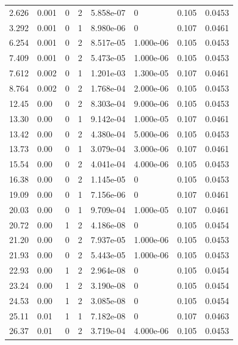 \documentclass[preview]{standalone}
\begin{document}
{{\begin{tabular}{L{1.2cm}C{1.2cm} C{0.3cm}C{0.5cm} C{1.4cm}C{1.4cm} C{1.4cm}C{1.4cm}}
  2.626  &  0.001  & 0     &  2 &  5.858e-07  & 0  & 0.105 &  0.0453   \\ 
  3.292  &  0.001  & 0     &  1 &  8.980e-06  & 0  & 0.107 &  0.0461   \\ 
  6.254  &  0.001  & 0     &  2 &  8.517e-05  & 1.000e-06  & 0.105 &  0.0453   \\ 
  7.409  &  0.001  & 0     &  2 &  5.473e-05  & 1.000e-06  & 0.105 &  0.0453   \\ 
  7.612  &  0.002  & 0     &  1 &  1.201e-03  & 1.300e-05  & 0.107 &  0.0461   \\ 
  8.764  &  0.002  & 0     &  2 &  1.768e-04  & 2.000e-06  & 0.105 &  0.0453   \\ 
  12.45  &  0.00  & 0     &  2 &  8.303e-04  & 9.000e-06  & 0.105 &  0.0453   \\ 
  13.30  &  0.00  & 0     &  1 &  9.142e-04  & 1.000e-05  & 0.107 &  0.0461   \\ 
  13.42  &  0.00  & 0     &  2 &  4.380e-04  & 5.000e-06  & 0.105 &  0.0453   \\ 
  13.73  &  0.00  & 0     &  1 &  3.079e-04  & 3.000e-06  & 0.107 &  0.0461   \\ 
  15.54  &  0.00  & 0     &  2 &  4.041e-04  & 4.000e-06  & 0.105 &  0.0453   \\ 
  16.38  &  0.00  & 0     &  2 &  1.145e-05  & 0  & 0.105 &  0.0453   \\ 
  19.09  &  0.00  & 0     &  1 &  7.156e-06  & 0  & 0.107 &  0.0461   \\ 
  20.03  &  0.00  & 0     &  1 &  9.709e-04  & 1.000e-05  & 0.107 &  0.0461   \\ 
  20.72  &  0.00  & 1     &  2 &  4.186e-08  & 0  & 0.105 &  0.0454   \\ 
  21.20  &  0.00  & 0     &  2 &  7.937e-05  & 1.000e-06  & 0.105 &  0.0453   \\ 
  21.93  &  0.00  & 0     &  2 &  5.443e-05  & 1.000e-06  & 0.105 &  0.0453   \\ 
  22.93  &  0.00  & 1     &  2 &  2.964e-08  & 0  & 0.105 &  0.0454   \\ 
  23.24  &  0.00  & 1     &  2 &  3.190e-08  & 0  & 0.105 &  0.0454   \\ 
  24.53  &  0.00  & 1     &  2 &  3.085e-08  & 0  & 0.105 &  0.0454   \\ 
  25.11  &  0.01  & 1     &  1 &  7.182e-08  & 0  & 0.107 &  0.0463   \\ 
  26.37  &  0.01  & 0     &  2 &  3.719e-04  & 4.000e-06  & 0.105 &  0.0453   \\ 

\end{tabular}}}
\end{document}
